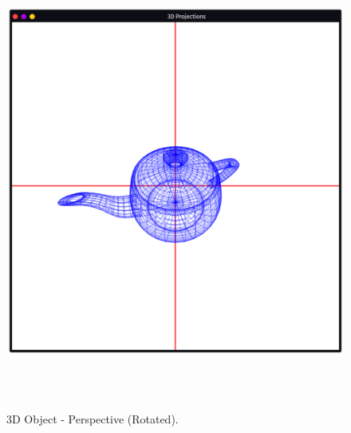 \documentclass[12pt, a4]{article}
\begin{document}
\subsection*{}
\begin{figure}[h]
\centering
\caption{3D Object - Perspective (Rotated).}
\includegraphics[height=15cm, width=15cm]{Outputs/Perspective2.png}
\end{figure}


\newpage
\end{document}
